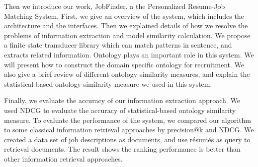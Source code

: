 Then we introduce our work, JobFinder, a the Personalized Resume-Job Matching System. First, we give an overview of the system, which includes the architecture and the interfaces. Then we explained details of how we resolve the problems of information extraction and model similarity calculation. We propose a finite state transducer library which can match patterns in sentence, and extracts related information. Ontology plays an important role in this system. We will present how to construct the domain specific ontology for recruitment. We also give a brief review of different ontology similarity measures, and explain the statistical-based ontology similarity measure we used in this system.

Finally, we evaluate the accuracy of our information extraction approach. We used NDCG to evaluate the accuracy of statistical-based ontology similarity measure. To evaluate the performance of the system, we compared our algorithm to some classical information retrieval approaches by precision@k and NDCG. We created a data set of job descriptions as documents, and use r\'esum\'es as query to retrieval documents. The result shows the ranking performance is better than other information retrieval approaches.
